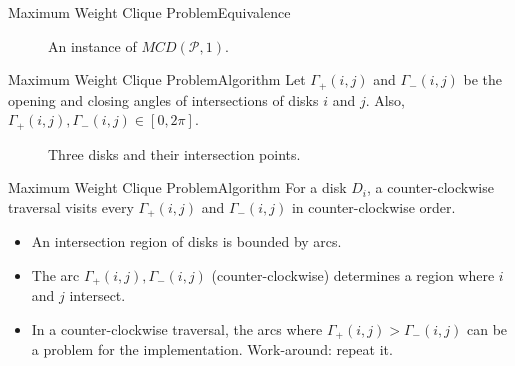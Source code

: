 \documentclass{beamer}
\newcommand{\Pp}{\mathscr{P}}
\begin{document}
\begin{frame}{Maximum Weight Clique Problem}{Equivalence}
	\begin{figure}[H]
		\centering
		
		\caption{An instance of $MCD(\Pp,1)$.}
		\label{fig:max_wieght_clique}
	\end{figure}
\end{frame}

\begin{frame}{Maximum Weight Clique Problem}{Algorithm}
	Let $\Gamma_+(i,j)$ and $\Gamma_-(i,j)$ be the opening and closing angles of intersections of disks $i$ and $j$. Also, $\Gamma_+(i,j), \Gamma_-(i,j) \in [0,2\pi]$.
	\begin{figure}[H]
		\centering
		
		\caption{Three disks and their intersection points.}
		
		\label{fig:3disks_intersect}
	\end{figure}
\end{frame}

\begin{frame}{Maximum Weight Clique Problem}{Algorithm}
	For a disk $D_i$, a counter-clockwise traversal visits every $\Gamma_+(i,j)$ and $\Gamma_-(i,j)$ in counter-clockwise order.
	
	\begin{itemize}
		\item An intersection region of disks is bounded by arcs.
		
		\item The arc $\Gamma_+(i,j),\Gamma_-(i,j)$ (counter-clockwise) determines a region where $i$ and $j$ intersect.
		
		\item In a counter-clockwise traversal, the arcs where $\Gamma_+(i,j) > \Gamma_-(i,j)$ can be a problem for the implementation. Work-around: repeat it.
	\end{itemize}
\end{frame}
\end{document}
